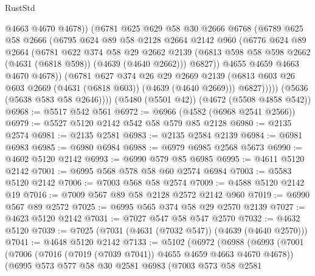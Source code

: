 \begin{lexlean}{RustStd}
\begin{coremodule}
                  @4663
                  @4670
                  @4678))
              (@6781
                @625
                @629
                @58
                @30
                @2666
                @6768
                (@6789
                  @625
                  @58
                  @2666
                  (@6795
                    @624
                    @89
                    @58
                    @2128
                    @2664
                    @2142
                    @960
                    (@6776
                      @624
                      @89
                      @2664
                      (@6781
                        @622
                        @374
                        @58
                        @29
                        @2662
                        @2139
                        (@6813 @598 @58 @598 @2662 (@4631 (@6818 @598)) (@4639 (@4640 @2662)))
                        @6827))
                    @4655
                    @4659
                    @4663
                    @4670
                    @4678))
                (@6781
                  @627
                  @374
                  @26
                  @29
                  @2669
                  @2139
                  (@6813 @603 @26 @603 @2669 (@4631 (@6818 @603)) (@4639 (@4640 @2669)))
                  @6827)))))
        (@5636 (@5638 @583 @58 @2646))))
    (@5480 (@5501 @42))
    (@4672 (@5508 @4858 @542))
@6968 := @5517 @542 @561
@6972 := @6966 (@4582 (@6968 @2541 @2566))
@6979 := @5527 @5120 @2142 @542 @58 @579 @85 @2128
@6980 := @2135 @2574
@6981 := @2135 @2581
@6983 := @2135 @2584 @2139
@6984 := @6981 @6983
@6985 := @6980 @6984
@6988 := @6979 @6985 @2568 @5673
@6990 := @4602 @5120 @2142
@6993 := @6990 @579 @85 @6985
@6995 := @4611 @5120 @2142
@7001 := @6995 @568 @578 @58 @60 @2574 @6984
@7003 := @5583 @5120 @2142
@7006 := @7003 @568 @58 @2574
@7009 := @4588 @5120 @2142 @19
@7016 := @7009 @567 @89 @58 @2128 @2572 @2142 @960
@7019 := @6990 @567 @89 @2572
@7025 := @6995 @565 @374 @58 @29 @2570 @2139
@7027 := @4623 @5120 @2142
@7031 := @7027 @547 @58 @547 @2570
@7032 := @4632 @5120
@7039 := @7025 (@7031 (@4631 (@7032 @547)) (@4639 (@4640 @2570)))
@7041 := @4648 @5120 @2142
@7133 := @5102
    (@6972
      (@6988
        (@6993
          (@7001
            (@7006 (@7016 (@7019 (@7039 @7041)) @4655 @4659 @4663 @4670 @4678))
            (@6995
              @573
              @577
              @58
              @30
              @2581
              @6983
              (@7003
                @573
                @58
                @2581

\end{coremodule}
\end{lexlean}
